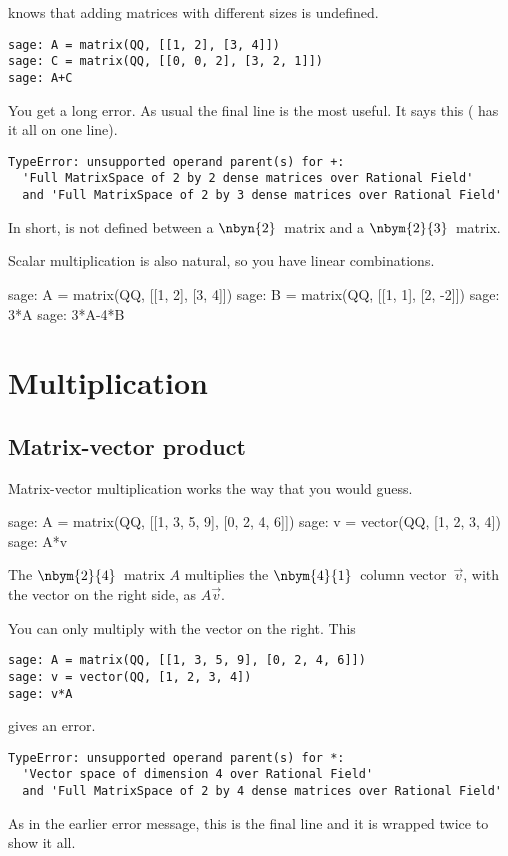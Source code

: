 \Sage{} knows that adding matrices with different sizes is undefined.
\begin{lstlisting}
sage: A = matrix(QQ, [[1, 2], [3, 4]])
sage: C = matrix(QQ, [[0, 0, 2], [3, 2, 1]])
sage: A+C
\end{lstlisting}
You get a long error.
As usual the final line is the most useful.
It says this (\Sage{} has it all on one line).
\begin{lstlisting}
TypeError: unsupported operand parent(s) for +: 
  'Full MatrixSpace of 2 by 2 dense matrices over Rational Field' 
  and 'Full MatrixSpace of 2 by 3 dense matrices over Rational Field'
\end{lstlisting}
In short, \inlinecode{+} is not defined between a
$\nbyn{2}$~matrix and a $\nbym{2}{3}$~matrix.

Scalar multiplication is also natural,
so you have linear combinations.
\begin{sagecommandline}[d,0,2]
sage: A = matrix(QQ, [[1, 2], [3, 4]])
sage: B = matrix(QQ, [[1, 1], [2, -2]])
sage: 3*A
sage: 3*A-4*B
\end{sagecommandline}



\section{Multiplication}

\subsection{Matrix-vector product}
Matrix-vector multiplication works the way that you would guess.
\begin{sagecommandline}
sage: A = matrix(QQ, [[1, 3, 5, 9], [0, 2, 4, 6]])
sage: v = vector(QQ, [1, 2, 3, 4])
sage: A*v
\end{sagecommandline}
\noindent
The $\nbym{2}{4}$~matrix $A$ multiplies the 
$\nbym{4}{1}$~column vector~$\vec{v}$, with the vector on the right side,
as $A\vec{v}$.

You can only multiply with the vector on the right.
This
\begin{lstlisting}
sage: A = matrix(QQ, [[1, 3, 5, 9], [0, 2, 4, 6]])
sage: v = vector(QQ, [1, 2, 3, 4])
sage: v*A
\end{lstlisting}
gives an error.
\begin{lstlisting}
TypeError: unsupported operand parent(s) for *: 
  'Vector space of dimension 4 over Rational Field' 
  and 'Full MatrixSpace of 2 by 4 dense matrices over Rational Field'
\end{lstlisting}
As in the earlier error message, 
this is the final line and it is wrapped twice to show it all.

